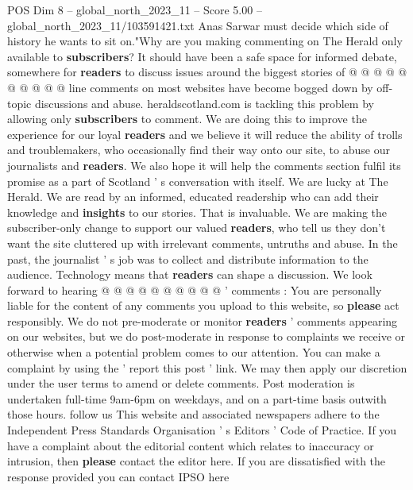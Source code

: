 \begin{textsample}{POS Dim 8 – global\_north\_2023\_11 – Score 5.00 – global\_north\_2023\_11/103591421.txt}
Anas Sarwar must decide which side of history he wants to sit on."Why are you making commenting on The Herald only available to \textbf{subscribers}?
It should have been a safe space for informed debate, somewhere for \textbf{readers} to discuss issues around the biggest stories of @ @ @ @ @ @ @ @ @ @ line comments on most websites have become bogged down by off-topic discussions and abuse. heraldscotland.com is tackling this problem by allowing only \textbf{subscribers} to comment.
We are doing this to improve the experience for our loyal \textbf{readers} and we believe it will reduce the ability of trolls and troublemakers, who occasionally find their way onto our site, to abuse our journalists and \textbf{readers}.
We also hope it will help the comments section fulfil its promise as a part of Scotland ' s conversation with itself.
We are lucky at The Herald.
We are read by an informed, educated readership who can add their knowledge and \textbf{insights} to our stories.
That is invaluable.
We are making the subscriber-only change to support our valued \textbf{readers}, who tell us they don't want the site cluttered up with irrelevant comments, untruths and abuse.
In the past, the journalist ' s job was to collect and distribute information to the audience.
Technology means that \textbf{readers} can shape a discussion.
We look forward to hearing @ @ @ @ @ @ @ @ @ @ ' comments : You are personally liable for the content of any comments you upload to this website, so \textbf{please} act responsibly.
We do not pre-moderate or monitor \textbf{readers} ' comments appearing on our websites, but we do post-moderate in response to complaints we receive or otherwise when a potential problem comes to our attention.
You can make a complaint by using the ' report this post ' link.
We may then apply our discretion under the user terms to amend or delete comments.
Post moderation is undertaken full-time 9am-6pm on weekdays, and on a part-time basis outwith those hours. follow us This website and associated newspapers adhere to the Independent Press Standards Organisation ' s Editors ' Code of Practice.
If you have a complaint about the editorial content which relates to inaccuracy or intrusion, then \textbf{please} contact the editor here.
If you are dissatisfied with the response provided you can contact IPSO here

\end{textsample}
